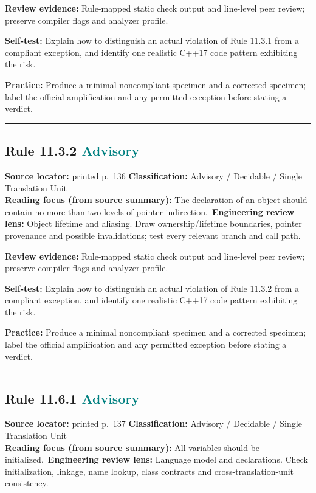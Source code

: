 \documentclass[10pt,letterpaper]{article}
\begin{document}
\textbf{Review evidence:} Rule-mapped static check output and line-level peer review; preserve compiler flags and analyzer profile.

\textbf{Self-test:} Explain how to distinguish an actual violation of Rule 11.3.1 from a compliant exception, and identify one realistic C++17 code pattern exhibiting the risk.\par
\textbf{Practice:} Produce a minimal noncompliant specimen and a corrected specimen; label the official amplification and any permitted exception before stating a verdict.
\smallskip\hrule\smallskip
\subsection*{Rule 11.3.2 \enspace \texorpdfstring{\small\textcolor{teal}{Advisory}}{Advisory}}
\noindent\textbf{Source locator:} printed p.~136 \quad\textbf{Classification:} Advisory / Decidable / Single Translation Unit\\
\textbf{Reading focus (from source summary):} The declaration of an object should contain no more than two levels of pointer indirection.\
\textbf{Engineering review lens:} Object lifetime and aliasing. Draw ownership/lifetime boundaries, pointer provenance and possible invalidations; test every relevant branch and call path.

\textbf{Review evidence:} Rule-mapped static check output and line-level peer review; preserve compiler flags and analyzer profile.

\textbf{Self-test:} Explain how to distinguish an actual violation of Rule 11.3.2 from a compliant exception, and identify one realistic C++17 code pattern exhibiting the risk.\par
\textbf{Practice:} Produce a minimal noncompliant specimen and a corrected specimen; label the official amplification and any permitted exception before stating a verdict.
\smallskip\hrule\smallskip
\subsection*{Rule 11.6.1 \enspace \texorpdfstring{\small\textcolor{teal}{Advisory}}{Advisory}}
\noindent\textbf{Source locator:} printed p.~137 \quad\textbf{Classification:} Advisory / Decidable / Single Translation Unit\\
\textbf{Reading focus (from source summary):} All variables should be initialized.\
\textbf{Engineering review lens:} Language model and declarations. Check initialization, linkage, name lookup, class contracts and cross-translation-unit consistency.
\end{document}
